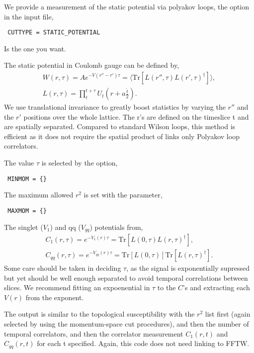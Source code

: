 \documentclass[12pt]{article}
\begin{document}
We provide a measurement of the static potential via polyakov loops, the option in the input file,
\begin{verbatim}
 CUTTYPE = STATIC_POTENTIAL
\end{verbatim}
Is the one you want.

The static potential in Coulomb gauge can be defined by,
\begin{equation}
\begin{gathered}
 W(r,\tau) = Ae^{-V(r''-r')\tau} = \langle \text{Tr}\left[L(r'',\tau) L(r',\tau)^{\dagger}\right] \rangle, \\
 L(r,\tau) = \prod_{t}^{t+\tau} U_t\left(r+a\frac{\hat{t}}{2}\right).
 \end{gathered}
\end{equation}
We use translational invariance to greatly boost statistics by varying the $r''$ and the $r'$ positions over the whole lattice. The r's are defined on the timeslice t and are spatially separated. Compared to standard Wilson loops, this method is efficient as it does not require the spatial product of links only Polyakov loop correlators.

The value $\tau$ is selected by the option,
\begin{verbatim}
 MINMOM = {}
\end{verbatim}

The maximum allowed $r^2$ is set with the parameter,
\begin{verbatim}
 MAXMOM = {}
\end{verbatim}

The singlet ($V_1$) and qq ($V_{qq}$) potentials from,
\begin{equation}
\begin{aligned}
 C_1(r,\tau) = e^{-V_{1}(r)\tau} = \text{Tr}\left[ L(0,\tau) L(r,\tau)^{\dagger} \right],\nonumber \\
C_{qq}(r,\tau) = e^{-V_{qq}(r)\tau} = \text{Tr}\left[ L(0,\tau)\right]\text{Tr}\left[ L(r,\tau)^{\dagger} \right].
\end{aligned}
\end{equation}
Some care should be taken in deciding $\tau$, as the signal is exponentially supressed but yet should be well enough separated to avoid temporal correlations between slices. We recommend fitting an expoenential in $\tau$ to the $C$'s and extracting each $V(r)$ from the exponent.

The output is similar to the topological susceptibility with the $r^2$ list first (again selected by using the momentum-space cut procedures), and then the number of temporal correlators, and then the correlator measurement $C_1(r,t)$ and $C_{qq}(r,t)$ for each t specified. Again, this code does not need linking to FFTW.
\end{document}
